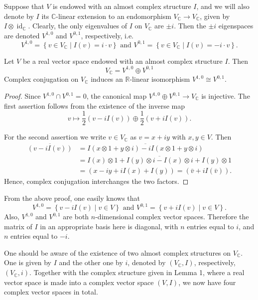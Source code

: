 \documentclass{ctexart}
\begin{document}
Suppose that $V$ is endowed with an almost complex structure $I$, and we will also denote by $I$ its $\mathbb{C}$-linear extension to an endomorphism $V_{\mathbb{C}} \rightarrow V_{\mathbb{C}}$, 
given by $I\otimes \operatorname{id}_\mathbb{C}$. Clearly, the only eigenvalues of $I$ on $V_{\mathbb{C}}$ are $\pm i$. Then the $\pm i$ eigenspaces are denoted $V^{1,0}$ and $V^{0,1}$, respectively, i.e.
$$
V^{1,0}=\left\{v \in V_{\mathbb{C}} \mid I(v)=i \cdot v\right\} \text { and } V^{0,1}=\left\{v \in V_{\mathbb{C}} \mid I(v)=-i \cdot v\right\} .
$$
\begin{lemma}
  Let $V$ be a real vector space endowed with an almost complex structure $I$. Then
  $$
  V_{\mathbb{C}}=V^{1,0} \oplus V^{0,1}
  $$
  Complex conjugation on $V_{\mathbb{C}}$ induces an $\mathbb{R}$-linear isomorphism $V^{1,0} \cong V^{0,1}$.
\end{lemma}
\begin{proof}[Proof]
  Since $V^{1,0} \cap V^{0,1}=0$, the canonical map $V^{1,0} \oplus V^{0,1} \longrightarrow V_{\mathbb{C}}$ is injective. 
  The first assertion follows from the existence of the inverse map
  $$
  v \longmapsto \frac{1}{2}(v-i I(v)) \oplus \frac{1}{2}(v+i I(v)) .
  $$

  For the second assertion we write $v \in V_{\mathbb{C}}$ as $v=x+i y$ with $x, y \in V$.
  Then 
  $$
  \begin{aligned}
    \overline{(v-i I(v))}&=\overline{I(x\otimes 1 + y\otimes i)-i I(x\otimes 1 + y\otimes i)} \\
    &=\overline{I(x)\otimes 1+I(y)\otimes i-I(x)\otimes i + I(y)\otimes 1} \\
    &=(x-i y+i I(x)+I(y))=(\bar{v}+i I(\bar{v})).
  \end{aligned}
  $$ Hence, complex conjugation interchanges the two factors.
\end{proof}
From the above proof, one easily knows that
\begin{equation}
  V^{1,0}=\left\{v-iI(v) \mid v\in V\right\} \text { and } V^{0,1}=\left\{v+iI(v) \mid v\in V\right\}.
\end{equation}
Also, $V^{1,0}$ and $V^{0,1}$ are both $n$-dimensional complex vector spaces. Therefore the matrix of $I$ in an appropriate basis here is diagonal, with $n$ entries equal to $i$, 
and $n$ entries equal to $-i$. 

One should be aware of the existence of two almost complex structures on $V_{\mathbb{C}}$. 
One is given by $I$ and the other one by $i$, denoted by $(V_\mathbb{C},I)$, respectively, $(V_\mathbb{C},i)$. 
Together with the complex structure given in Lemma 1, where a real vector space is made into a complex vector space $(V,I)$, we now have four complex vector spaces in total.
\end{document}
